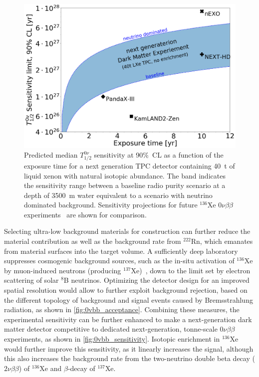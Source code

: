 \begin{figure}[!htbp]
\begin{center}
\includegraphics[width=0.99\columnwidth]{fig_0vbb_sensitivity.png}
\caption{Predicted median $T_{1/2}^{0\nu}$ sensitivity at 90\%~CL as a function of the exposure time for a next generation TPC detector containing \SI{40}{t} of liquid xenon with natural isotopic abundance. The band indicates the sensitivity range between a baseline radio purity scenario at a depth of \SI{3500}{m} water equivalent to a scenario with neutrino dominated background. Sensitivity projections for future $^{136}$Xe $0\nu\beta\beta$ experiments~\cite{Agostini:2020adk, Gomez_NEXT:2019, Chen:2016qcd, Albert:2017hjq, Barabash:2015eza} are shown for comparison.}\label{fig:0vbb_sensitivity}
\end{center}
\end{figure}

Selecting ultra-low background materials for construction can further reduce the material contribution as well as the background rate from $^{222}$Rn, which emanates from material surfaces into the target volume. A sufficiently deep laboratory suppresses cosmogenic background sources, such as the in-situ activation of $^{136}$Xe by muon-induced neutrons (producing $^{137}$Xe)~\cite{Cebrian:2020bwn,Rogers:2020npx}, down to the limit set by electron scattering of solar $^{8}$B neutrinos. Optimizing the detector design for an improved spatial resolution would allow to further exploit background rejection, based on the different topology of background and signal events caused by Bremsstrahlung radiation, as shown in \autoref{fig:0vbb_acceptance}. Combining these measures, the experimental sensitivity can be further enhanced to make a next-generation dark matter detector competitive to dedicated next-generation, tonne-scale $0\nu\beta\beta$ experiments, as shown in \autoref{fig:0vbb_sensitivity}. Isotopic enrichment in $^{136}$Xe would further improve this sensitivity, as it linearly increases the signal, although this also increases the background rate from the two-neutrino double beta decay ($2\nu\beta\beta$) of $^{136}$Xe and $\beta$-decay of $^{137}$Xe.

